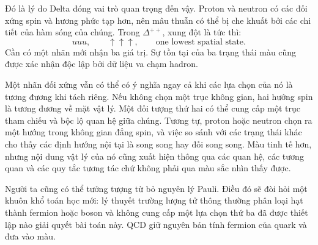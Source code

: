 \begin{classroomqa}
\end{classroomqa}


\begin{classroomqa}
\end{classroomqa}

Đó là lý do Delta đóng vai trò quan trọng đến vậy. Proton và neutron có các đối xứng spin và hương phức tạp hơn, nên mâu thuẫn có thể bị che khuất bởi các chi tiết của hàm sóng của chúng. Trong \(\Delta^{++}\), xung đột là tức thì:
\begin{equation}
uuu,\qquad
\uparrow\uparrow\uparrow,
\qquad
\text{one lowest spatial state}.
\end{equation}
Cần có một nhãn mới nhận ba giá trị. Sự tồn tại của ba trạng thái màu cũng được xác nhận độc lập bởi dữ liệu va chạm hadron.

Một nhãn đối xứng vẫn có thể có ý nghĩa ngay cả khi các lựa chọn của nó là tương đương khi tách riêng. Nếu không chọn một trục không gian, hai hướng spin là tương đương về mặt vật lý. Một đối tượng thứ hai có thể cung cấp một trục tham chiếu và bộc lộ quan hệ giữa chúng. Tương tự, proton hoặc neutron chọn ra một hướng trong không gian đẳng spin, và việc so sánh với các trạng thái khác cho thấy các định hướng nội tại là song song hay đối song song. Màu tinh tế hơn, nhưng nội dung vật lý của nó cũng xuất hiện thông qua các quan hệ, các tương quan và các quy tắc tương tác chứ không phải qua màu sắc nhìn thấy được.

Người ta cũng có thể tưởng tượng từ bỏ nguyên lý Pauli. Điều đó sẽ đòi hỏi một khuôn khổ toán học mới: lý thuyết trường lượng tử thông thường phân loại hạt thành fermion hoặc boson và không cung cấp một lựa chọn thứ ba đã được thiết lập nào giải quyết bài toán này. QCD giữ nguyên bản tính fermion của quark và đưa vào màu.

